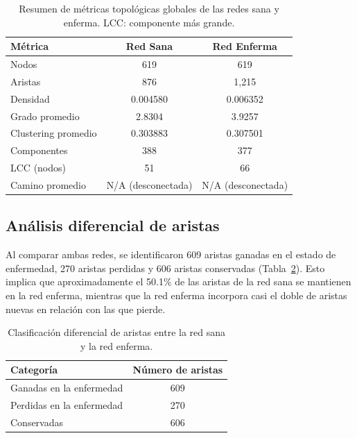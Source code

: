 \documentclass[conference]{IEEEtran}
\begin{document}
\begin{table}[!t]
    \centering
    \footnotesize
    \setlength{\tabcolsep}{3pt}
    \begin{tabular}{@{}>{\raggedright\arraybackslash}p{}cc@{}}
        \toprule
        \textbf{Métrica} & \textbf{Red Sana} & \textbf{Red Enferma} \\
        \midrule
        Nodos & 619 & 619 \\
        Aristas & 876 & 1,215 \\
        Densidad & 0.004580 & 0.006352 \\
        Grado promedio & 2.8304 & 3.9257 \\
        Clustering promedio & 0.303883 & 0.307501 \\
        Componentes & 388 & 377 \\
        LCC (nodos) & 51 & 66 \\
        Camino promedio & N/A (desconectada) & N/A (desconectada) \\
        \bottomrule
    \end{tabular}
    \caption{Resumen de métricas topológicas globales de las redes sana y enferma. LCC: componente más grande.}
    \label{tab:metricas}
\end{table}

\subsection{Análisis diferencial de aristas}

Al comparar ambas redes, se identificaron 609 aristas ganadas en el estado de enfermedad, 270 aristas perdidas y 606 aristas conservadas (Tabla~\ref{tab:aristas}). Esto implica que aproximadamente el 50.1\% de las aristas de la red sana se mantienen en la red enferma, mientras que la red enferma incorpora casi el doble de aristas nuevas en relación con las que pierde.

\begin{table}[!t]
    \centering
    \begin{tabular}{lc}
        \toprule
        \textbf{Categoría} & \textbf{Número de aristas} \\
        \midrule
        Ganadas en la enfermedad & 609 \\
        Perdidas en la enfermedad & 270 \\
        Conservadas & 606 \\
        \bottomrule
    \end{tabular}
    \caption{Clasificación diferencial de aristas entre la red sana y la red enferma.}
    \label{tab:aristas}
\end{table}
\end{document}
